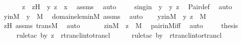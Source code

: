 \begin{isabellebody}
%
\isadelimproof
%
\endisadelimproof
%
\isatagproof
{}\isamarkupfalse%
\ {\isacharminus}{\kern0pt}\ \isanewline
\ \ \isamarkupfalse%
\ z\ \ zH\ {\isacharcolon}{\kern0pt}\ {\isachardoublequoteopen}{\isacharless}{\kern0pt}y{\isacharcomma}{\kern0pt}\ z{\isachargreater}{\kern0pt}\ {\isasymin}\ x{\isachardoublequoteclose}\ \isamarkupfalse%
\ assms\ \isamarkupfalse%
\ auto\ \isanewline
\ \ \isamarkupfalse%
\ singin\ {\isacharcolon}{\kern0pt}\ {\isachardoublequoteopen}{\isacharbraceleft}{\kern0pt}y{\isacharbraceright}{\kern0pt}\ {\isasymin}\ {\isacharless}{\kern0pt}y{\isacharcomma}{\kern0pt}\ z{\isachargreater}{\kern0pt}{\isachardoublequoteclose}\ \isamarkupfalse%
\ Pair{\isacharunderscore}{\kern0pt}def\ \isamarkupfalse%
\ auto\ \isanewline
\ \ \isamarkupfalse%
\ yinM\ {\isacharcolon}{\kern0pt}\ {\isachardoublequoteopen}y\ {\isasymin}\ M{\isachardoublequoteclose}\ \isamarkupfalse%
\ domain{\isacharunderscore}{\kern0pt}elem{\isacharunderscore}{\kern0pt}in{\isacharunderscore}{\kern0pt}M\ assms\ \isamarkupfalse%
\ auto\isanewline
\ \ \isamarkupfalse%
\ yzinM\ {\isacharcolon}{\kern0pt}\ {\isachardoublequoteopen}{\isacharless}{\kern0pt}y{\isacharcomma}{\kern0pt}\ z{\isachargreater}{\kern0pt}\ {\isasymin}\ M{\isachardoublequoteclose}\ \isamarkupfalse%
\ zH\ assms\ transM\ \isamarkupfalse%
\ auto\ \isanewline
\ \ \isamarkupfalse%
\ \isamarkupfalse%
\ zinM\ {\isacharcolon}{\kern0pt}\ {\isachardoublequoteopen}z\ {\isasymin}\ M{\isachardoublequoteclose}\ \isamarkupfalse%
\ pair{\isacharunderscore}{\kern0pt}in{\isacharunderscore}{\kern0pt}M{\isacharunderscore}{\kern0pt}iff\ \isamarkupfalse%
\ auto\ \isanewline
\ \ \isamarkupfalse%
\ {\isacharquery}{\kern0pt}thesis\isanewline
\ \ \ \ \isamarkupfalse%
{\isacharparenleft}{\kern0pt}rule{\isacharunderscore}{\kern0pt}tac\ b{\isacharequal}{\kern0pt}{\isachardoublequoteopen}{\isacharless}{\kern0pt}y{\isacharcomma}{\kern0pt}\ z{\isachargreater}{\kern0pt}{\isachardoublequoteclose}\ \ rtrancl{\isacharunderscore}{\kern0pt}into{\isacharunderscore}{\kern0pt}trancl{}{\isacharparenright}{\kern0pt}\isanewline
\ \ \ \ \ \isamarkupfalse%
{\isacharparenleft}{\kern0pt}rule{\isacharunderscore}{\kern0pt}tac\ b{\isacharequal}{\kern0pt}{\isachardoublequoteopen}{\isacharbraceleft}{\kern0pt}y{\isacharbraceright}{\kern0pt}{\isachardoublequoteclose}\ \ rtrancl{\isacharunderscore}{\kern0pt}into{\isacharunderscore}{\kern0pt}rtrancl{\isacharparenright}{\kern0pt}\isanewline

\end{isabellebody}
